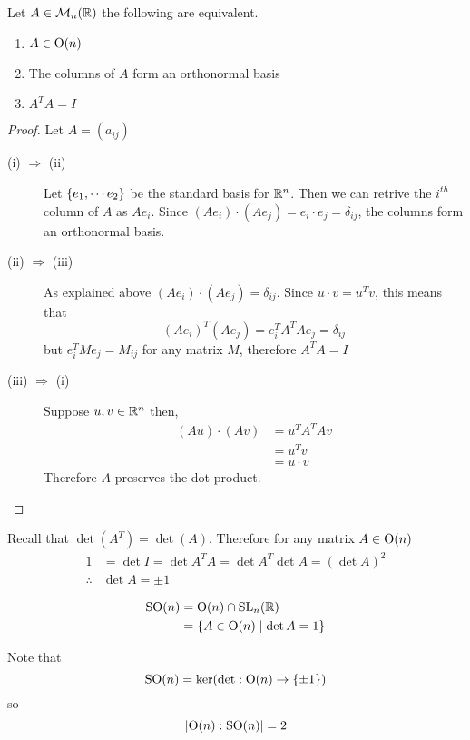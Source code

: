 \documentclass{article}
\begin{document}
\begin{lemma}[Matrices in $\Or(n)$]
    Let $A \in \mathcal{M}_n(\mathbb{R})$ the following are equivalent.
    \begin{enumerate}
        \item $A \in \mathrm{O}(n)$
        \item The columns of $A$ form an orthonormal basis
        \item $A^TA = I$
    \end{enumerate}
\end{lemma}
\begin{proof}
    Let $A = (a_{ij})$
    \begin{description}
        \item[(i) $\Rightarrow$ (ii)] Let $\left\{ e_1, \cdots e_2 \right\}$ be the standard basis for $\mathbb{R}^n$. 
        Then we can retrive the $i^{th}$ column of $A$ as $Ae_i$. Since $(Ae_i) \cdot (Ae_j) = e_i \cdot e_j = \delta_{ij}$,
        the columns form an orthonormal basis.
        \item[(ii) $\Rightarrow$ (iii)] As explained above $(Ae_i) \cdot (Ae_j) = \delta_{ij}$. 
        Since $u \cdot v = u^Tv$, this means that 
        \[
            (Ae_i)^T(Ae_j) = e^T_iA^TAe_j = \delta_{ij}
        \]
        but $e^T_iMe_j = M_{ij}$ for any matrix $M$, therefore $A^TA = I$
        \item[(iii) $\Rightarrow$ (i)] Suppose $u, v \in \mathbb{R}^n$ then,
        \begin{align*}
            (Au) \cdot (Av) &= u^TA^TAv \\
            &= u^Tv \tag{since $A^TA = I$}\\
            &= u \cdot v
        \end{align*}
        Therefore $A$ preserves the dot product.
    \end{description}
\end{proof}

Recall that $\det(A^T) = \det(A)$. Therefore for any matrix $A \in \mathrm{O}(n)$
\begin{align*}
    1 &= \det I = \det A^T A = \det A^T \det A = (\det A)^2 \\
    \therefore &\det A = \pm 1
\end{align*}

\begin{defi}
    \begin{align*}
        \mathrm{SO}(n) &= \mathrm{O}(n) \cap \mathrm{SL}_n(\mathbb{R}) \\
        &= \left\{ A \in \mathrm{O}(n) \mid \det A = 1 \right\} \\
    \end{align*}
\end{defi}
\begin{remark}
    Note that
    \[
        \mathrm{SO}(n) = \ker(\det: \mathrm{O}(n) \rightarrow \left\{ \pm 1 \right\})  
    \]
    so 
    \[
        \left\lvert \mathrm{O}(n) : \mathrm{SO}(n)\right\rvert = 2  
    \]
\end{remark}
\end{document}
